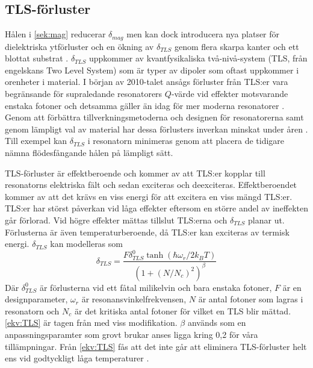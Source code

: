 \documentclass[main.tex]{subfiles}
\begin{document}

\subsection{TLS-förluster}
\label{sec:tls}
Hålen i \ref{sek:mag} reducerar $\delta_{mag}$ men kan dock introducera nya platser för dielektriska ytförluster och en ökning av $\delta_{TLS}$ genom flera skarpa kanter och ett blottat substrat \cite{Chiaro2016}. $\delta_{TLS}$ uppkommer av kvantfysikaliska två-nivå-system (TLS, från engelskans Two Level System) som är typer av dipoler som oftast uppkommer i orenheter i material. I början av 2010-talet ansågs förluster från TLS:er vara begränsande för supraledande resonatorers $Q$-värde vid effekter motsvarande enstaka fotoner \cite{Siddiqi2011} och detsamma gäller än idag för mer moderna resonatorer \cite{Boehme2016}\cite{Goetz2016}. Genom att förbättra tillverkningsmetoderna och designen för resonatorerna samt genom lämpligt val av material har dessa förlusters inverkan minskat under åren \cite{Oliver2013}. Till exempel kan $\delta_{TLS}$ i resonatorn minimeras genom att placera de tidigare nämna flödesfångande hålen på lämpligt sätt\cite{Chiaro2016}.

TLS-förluster är effektberoende och kommer av att TLS:er kopplar till resonatorns elektriska fält och sedan exciteras och deexciteras\cite{Boehme2016,Goetz2016}. 
Effektberoendet kommer av att det krävs en viss energi för att excitera en viss mängd TLS:er. TLS:er har störst påverkan vid låga effekter eftersom en större andel av ineffekten går förlorad. Vid högre effekter mättas tillslut TLS:erna och $\delta_{TLS}$ planar ut. Förlusterna är även temperaturberoende, då TLS:er kan exciteras av termisk energi.
$\delta_{TLS}$ kan modelleras som
\begin{equation}
    \delta_{TLS}=\frac{F\delta_{TLS}^0\tanh{(\hbar\omega_r/2k_BT)}}{(1+(N/N_c)^2)^\beta}
    \label{ekv:TLS}
\end{equation}
Där $\delta_{TLS}^0$ är förlusterna vid ett fåtal milikelvin och bara enstaka fotoner, $F$ är en designparameter, $\omega_r$ är resonansvinkelfrekvensen, $N$ är antal fotoner som lagras i resonatorn och $N_c$ är det kritiska antal fotoner för vilket en TLS blir mättad. \eqref{ekv:TLS} är tagen från \cite{pappas2011two} med viss modifikation. $\beta$ används som en anpassningsparamter som grovt brukar anses ligga kring 0,2 \cite{faoro2012} för våra tillämpningar. Från \eqref{ekv:TLS} fås att det inte går att eliminera TLS-förluster helt ens vid godtyckligt låga temperaturer \cite{Boehme2016}.
\end{document}
